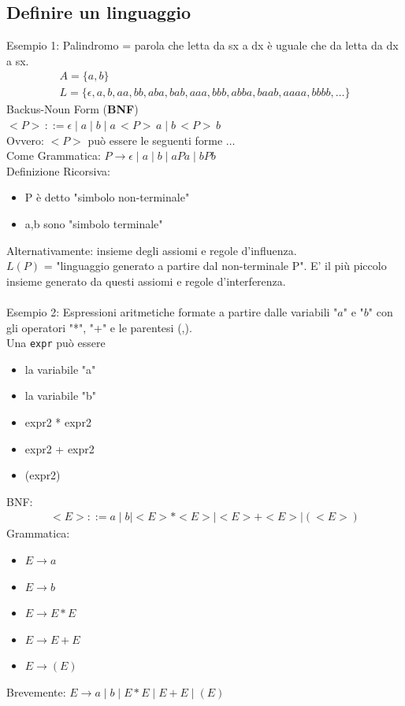 \documentclass[a4paper,12pt]{article}
\begin{document}
\subsection{Definire un linguaggio}
Esempio 1: Palindromo = parola che letta da sx a dx è uguale che da letta da dx a sx.
\begin{align*}
  A = \{a,b\} \\
  L = \{\epsilon, a, b, aa, bb, aba, bab, aaa, bbb, abba, baab, aaaa, bbbb, \dots \}
\end{align*}
Backus-Noun Form (\textbf{BNF}) \\
$<P> \, ::= \epsilon \mid a \mid b \mid a \, <P> \, a \mid b \, <P> \, b $\\ 
Ovvero: $<P>$ può essere le seguenti forme $\dots$ \\ 
\vspace{1em}
Come Grammatica: $P \to \epsilon \mid a \mid b \mid aPa \mid bPb$ \\
Definizione Ricorsiva: \begin{itemize}
 \item P è detto "simbolo non-terminale"
 \item a,b sono "simbolo terminale"
\end{itemize} 
Alternativamente: insieme degli assiomi e regole d'influenza. \\
$L(P)$ = "linguaggio generato a partire dal non-terminale P". E' il più piccolo insieme generato da questi assiomi e regole d'interferenza. \\
\vspace{2em} \\
Esempio 2: Espressioni aritmetiche formate a partire dalle variabili "$a$" e "$b$" con gli operatori "*", "+" e le parentesi (,). \\
Una \texttt{expr} può essere \begin{itemize}
  \item la variabile "a"
  \item la variabile "b"
  \item expr2 * expr2
  \item expr2 + expr2 
  \item (expr2)
\end{itemize}
BNF: 
\begin{align*}
  <E> ::= a \mid b \mid <E> * <E> \mid <E> + <E> \mid (<E>)
\end{align*}
Grammatica: 
\begin{itemize}
  \item $E \to a$
  \item $E \to b $
  \item $E \to E * E$
  \item $E \to E + E$
  \item $E \to (E)$
\end{itemize}
Brevemente: $E \to a \mid b \mid E * E \mid E+E \mid (E)$
\end{document}
